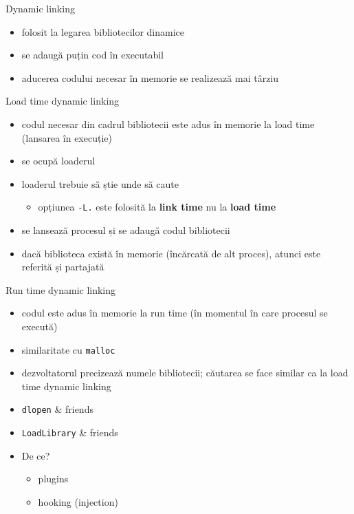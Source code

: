 \documentclass{beamer}
\begin{document}
\begin{frame}{Dynamic linking}
  \begin{itemize}
    \item folosit la legarea bibliotecilor dinamice
    \item se adaugă puțin cod în executabil
    \item aducerea codului necesar în memorie se realizează mai târziu
  \end{itemize}
\end{frame}

\begin{frame}{Load time dynamic linking}
  \begin{itemize}
    \item codul necesar din cadrul bibliotecii este adus în memorie la load
    time (lansarea în execuție)
    \item se ocupă loaderul
    \item loaderul trebuie să știe unde să caute
      \begin{itemize}
        \item opțiunea \texttt{-L.} este folosită la \textbf{link time} nu la
        \textbf{load time}
      \end{itemize}
    \item se lansează procesul și se adaugă codul bibliotecii
    \item dacă biblioteca există în memorie (încărcată de alt proces), atunci
    este referită și partajată
  \end{itemize}
\end{frame}

\begin{frame}{Run time dynamic linking}
  \begin{itemize}
    \item codul este adus în memorie la run time (în momentul în care procesul
    se execută)
    \item similaritate cu \texttt{malloc}
    \item dezvoltatorul precizează numele bibliotecii; căutarea se face
    similar ca la load time dynamic linking
    \item \texttt{dlopen} \& friends
    \item \texttt{LoadLibrary} \& friends
    \item De ce?
      \begin{itemize}
        \item plugins
        \item hooking (injection)
      \end{itemize}
  \end{itemize}
\end{frame}
\end{document}

